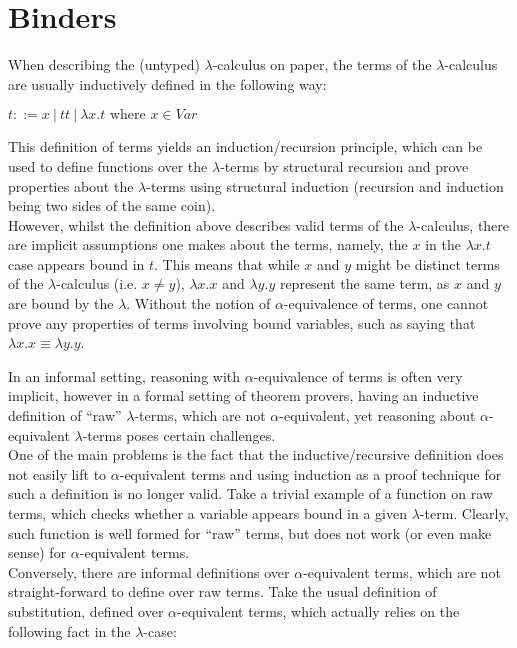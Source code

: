 \documentclass[a4paper, 12pt, twoside]{style/ociamthesis}
\theoremstyle{plain}
\theoremstyle{definition}
\theoremstyle{remark}
\begin{document}
\section{Binders}\label{binders}

\label{binders}

When describing the (untyped) \(\lambda\)-calculus on paper, the terms
of the \(\lambda\)-calculus are usually inductively defined in the
following way:

\begin{center}
$t::= x\ |\ tt\ |\ \lambda x.t \text{ where }x \in Var$
\end{center}

This definition of terms yields an induction/recursion principle, which
can be used to define functions over the \(\lambda\)-terms by structural
recursion and prove properties about the \(\lambda\)-terms using
structural induction (recursion and induction being two sides of the
same coin).\\
However, whilst the definition above describes valid terms of the
\(\lambda\)-calculus, there are implicit assumptions one makes about the
terms, namely, the \(x\) in the \(\lambda x.t\) case appears bound in
\(t\). This means that while \(x\) and \(y\) might be distinct terms of
the \(\lambda\)-calculus (i.e. \(x \neq y\)), \(\lambda x.x\) and
\(\lambda y.y\) represent the same term, as \(x\) and \(y\) are bound by
the \(\lambda\). Without the notion of \(\alpha\)-equivalence of terms,
one cannot prove any properties of terms involving bound variables, such
as saying that \(\lambda x.x \equiv \lambda y.y\).

In an informal setting, reasoning with \(\alpha\)-equivalence of terms
is often very implicit, however in a formal setting of theorem provers,
having an inductive definition of ``raw'' \(\lambda\)-terms, which are
not \(\alpha\)-equivalent, yet reasoning about \(\alpha\)-equivalent
\(\lambda\)-terms poses certain challenges.\\
One of the main problems is the fact that the inductive/recursive
definition does not easily lift to \(\alpha\)-equivalent terms and using
induction as a proof technique for such a definition is no longer valid.
Take a trivial example of a function on raw terms, which checks whether
a variable appears bound in a given \(\lambda\)-term. Clearly, such
function is well formed for ``raw'' terms, but does not work (or even
make sense) for \(\alpha\)-equivalent terms.\\
Conversely, there are informal definitions over \(\alpha\)-equivalent
terms, which are not straight-forward to define over raw terms. Take the
usual definition of substitution, defined over \(\alpha\)-equivalent
terms, which actually relies on the following fact in the
\(\lambda\)-case:
\end{document}
